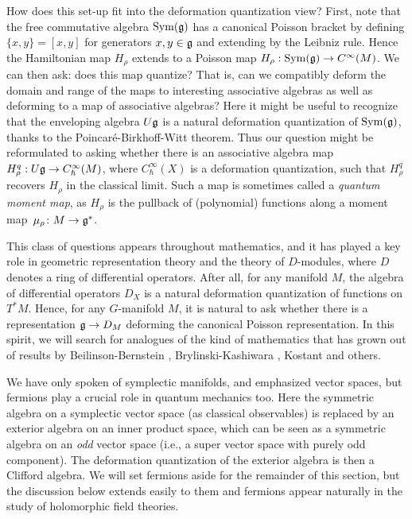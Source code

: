 \documentclass[11pt]{amsart}
\begin{document}
How does this set-up fit into the deformation quantization view?
First, note that the free commutative algebra $\operatorname{Sym}(\mathfrak g)$ has a canonical Poisson bracket by defining $ \{x, y \}   = [x, y]$ for generators $x, y \in \mathfrak g$ and extending by the Leibniz rule.
Hence the Hamiltonian map $H_\rho$ extends to a Poisson map $H_\rho: \operatorname{Sym}(\mathfrak g) \to C^\infty(M)$.
We can then ask: does this map quantize? That is, can we compatibly deform the domain and range of the maps to interesting associative algebras as well as deforming to a map of associative algebras?
Here it might be useful to recognize that the enveloping algebra $U\mathfrak g$ is a natural deformation quantization of $\operatorname{Sym}(\mathfrak g)$, thanks to the Poincar\'e-Birkhoff-Witt theorem.
Thus our question might be reformulated to asking whether there is an associative algebra map $H^q_\rho: U\mathfrak g \to C_\hbar^\infty(M)$, where $C_\hbar^\infty(X)$ is a deformation quantization, such that $H^q_\rho$ recovers $H_\rho$ in the classical limit.
Such a map is sometimes called a {\em quantum moment map},
as $H_\rho$ is the pullback of (polynomial) functions along a moment map~$\mu_\rho \colon M \to \mathfrak g^*$.

This class of questions appears throughout mathematics,
and it has played a key role in geometric representation theory and the theory of $D$-modules, where $D$ denotes a ring of differential operators.
After all, for any manifold $M$, the algebra of differential operators $D_X$ is a natural deformation quantization of functions on $T^* M$.
Hence, for any $G$-manifold $M$, it is natural to ask whether there is a representation $\mathfrak g \to D_M$ deforming the canonical Poisson representation.
In this spirit, we will search for analogues of the kind of mathematics that has grown out of results by Beilinson-Bernstein \cite{BB}, Brylinski-Kashiwara \cite{BryKash}, Kostant \cite{Kostant} and others.

\begin{rmk}
We have only spoken of symplectic manifolds, and emphasized vector spaces,
but fermions play a crucial role in quantum mechanics too.
Here the symmetric algebra on a symplectic vector space (as classical observables) 
is replaced by an exterior algebra on an inner product space,
which can be seen as a symmetric algebra on an {\em odd} vector space
(i.e., a super vector space with purely odd component).
The deformation quantization of the exterior algebra is then a Clifford algebra.
We will set fermions aside for the remainder of this section,
but the discussion below extends easily to them and fermions appear naturally in the study of holomorphic field theories.
\end{rmk}
\end{document}

